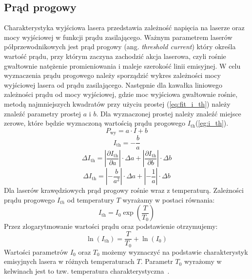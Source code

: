 \subsection{Prąd progowy}
Charakterystyka wyjściowa lasera przedstawia zależność napięcia na laserze oraz mocy wyjściowej w funkcji prądu zasilającego.
Ważnym parametrem laserów półprzewodnikowych jest prąd progowy (ang. \textit{threshold
current}) który określa wartość prądu, przy którym zaczyna zachodzić akcja laserowa, czyli
rośnie gwałtownie natężenie promieniowania i maleje szerokość linii emisyjnej. W celu wyznaczenia prądu progowego należy
sporządzić wykres zależności mocy wyjściowej lasera od prądu zasilającego. Następnie dla kawałka liniowego zależności prądu
od mocy wyjściowej, gdzie moc wyjściowa gwałtownie rośnie, metodą najmniejszych kwadratów przy użyciu prostej (\ref{eq:fit_i_th}) należy
znaleźć parametry prostej $a$ i $b$.
Dla wyznaczonej prostej należy znaleźć miejsce zerowe, które będzie wyznaczoną wartością prądu progowego $I_{\mathrm{th}}$(\ref{eg:i_th}).
\begin{equation}
\label{eq:fit_i_th}
P_{\mathrm{wy}} = a \cdot I + b
\end{equation}
\begin{equation}
\label{eg:i_th}
I_{\mathrm{th}} = -\frac{b}{a}
\end{equation}
\begin{equation}
\Delta I_{\mathrm{th}} = \left\lvert \frac{\partial I_{\mathrm{th}}}{\partial a} \right\rvert \cdot \Delta a + \left\lvert \frac{\partial I_{\mathrm{th}}}{\partial b} \right\rvert \cdot \Delta b
\end{equation}
\begin{equation}
\Delta I_{\mathrm{th}} = \left\lvert -\frac{b}{a^2} \right\rvert \cdot \Delta a + \left\lvert -\frac{1}{a} \right\rvert \cdot \Delta b
\end{equation}
Dla laserów krawędziowych prąd progowy rośnie wraz z temperaturą.
Zależności prądu progowego $I_{th}$ od temperatury $T$ wyrażamy w postaci równania:
\begin{equation}
\label{eq:i_th}
I_{\mathrm{th}} = I_0 \exp \left( \frac{T}{T_0} \right)
\end{equation}
Przez zlogarytmowanie wartości prądu oraz podstawienie otrzymujemy:
\begin{equation}
\ln(I_{\mathrm{th}}) = \frac{T}{T_0} + \ln(I_0)
\end{equation}
Wartości parametrów $I_0$ oraz $T_0$ możemy wyznaczyć na podstawie charakterystyk
emisyjnych lasera w różnych temperaturach $T$. Parametr
$T_{0}$ wyrażomy w kelwinach jest to tzw. temperatura charakterystyczna~\cite{opto_book}.

